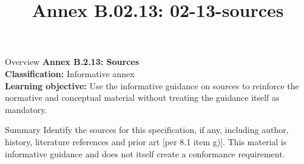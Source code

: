 \documentclass[10pt,letterpaper]{article}
\title{Annex B.02.13: 02-13-sources}
\author{}
\date{}
\begin{document}
\maketitle
\begin{CornellOverviewBox}{Overview}
{\Large\bfseries\textcolor{CNavy}{Annex B.2.13: Sources}}\\[3pt]
{\small\textbf{Classification:} Informative annex}\\
{\small\textbf{Learning objective:} Use the informative guidance on sources to reinforce the normative and conceptual material without treating the guidance itself as mandatory.}
\end{CornellOverviewBox}
\vspace{3pt}

\begin{CornellNotesTable}
\end{CornellNotesTable}


\begin{CornellSummaryBox}{Summary}
Identify the sources for this specification, if any, including author, history, literature references and prior art [per 8.1 item g)]. This material is informative guidance and does not itself create a conformance requirement.
\end{CornellSummaryBox}
\end{document}
